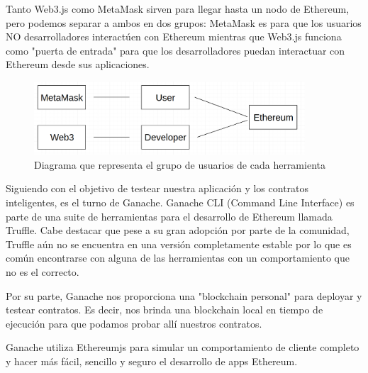 Tanto Web3.js como MetaMask sirven para llegar hasta un nodo de Ethereum, pero podemos separar 
a ambos en dos grupos: MetaMask es para que los usuarios NO desarrolladores interactúen con 
Ethereum mientras que Web3.js funciona como "puerta de entrada" para que los desarrolladores
puedan interactuar con Ethereum desde sus aplicaciones.

\begin{figure}[htbp!] 
\centering    
\includegraphics[width=0.9\textwidth]{metaweb3}
\caption[MetaWeb3]{Diagrama que representa el grupo de usuarios de cada herramienta}
\label{fig:metamask-web3}
\end{figure}


Siguiendo con el objetivo de testear nuestra aplicación y los contratos inteligentes, es el turno 
de Ganache. Ganache CLI (Command Line Interface) es parte de una suite de herramientas para el 
desarrollo de Ethereum llamada Truffle. Cabe destacar que pese a su gran adopción por parte de la 
comunidad, Truffle aún no se encuentra en una versión completamente estable por lo que es común
encontrarse con alguna de las herramientas con un comportamiento que no es el correcto.

Por su parte, Ganache nos proporciona una "blockchain personal" para deployar y testear contratos.
Es decir, nos brinda una blockchain local en tiempo de ejecución para que podamos probar allí
nuestros contratos.

Ganache utiliza Ethereumjs para simular un comportamiento de cliente completo y hacer más fácil,
sencillo y seguro el desarrollo de apps Ethereum.